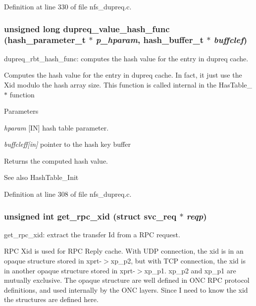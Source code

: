 Definition at line 330 of file nfs\_\-dupreq.c.
\subsubsection[{dupreq\_\-value\_\-hash\_\-func}]{\setlength{\rightskip}{0pt plus 5cm}unsigned long dupreq\_\-value\_\-hash\_\-func (hash\_\-parameter\_\-t $\ast$ {\em p\_\-hparam}, \/  hash\_\-buffer\_\-t $\ast$ {\em buffclef})}\label{nfs__dupreq_8c_a7363cd3531f6119e8a2047a57e51e08f}
dupreq\_\-rbt\_\-hash\_\-func: computes the hash value for the entry in dupreq cache.

Computes the hash value for the entry in dupreq cache. In fact, it just use the Xid modulo the hash array size. This function is called internal in the HasTable\_\-$\ast$ function


\begin{DoxyParams}{Parameters}
\item[{\em hparam}][IN] hash table parameter. \item[{\em buffcleff\mbox{[}in\mbox{]}}]pointer to the hash key buffer\end{DoxyParams}
\begin{DoxyReturn}{Returns}
the computed hash value.
\end{DoxyReturn}
\begin{DoxySeeAlso}{See also}
HashTable\_\-Init 
\end{DoxySeeAlso}


Definition at line 308 of file nfs\_\-dupreq.c.
\subsubsection[{get\_\-rpc\_\-xid}]{\setlength{\rightskip}{0pt plus 5cm}unsigned int get\_\-rpc\_\-xid (struct svc\_\-req $\ast$ {\em reqp})}\label{nfs__dupreq_8c_ae04d38ace0d9a143801c1625135d4ad7}
get\_\-rpc\_\-xid: extract the transfer Id from a RPC request.

RPC Xid is used for RPC Reply cache. With UDP connection, the xid is in an opaque structure stored in xprt-\/$>$xp\_\-p2, but with TCP connection, the xid is in another opaque structure stored in xprt-\/$>$xp\_\-p1. xp\_\-p2 and xp\_\-p1 are mutually exclusive. The opaque structure are well defined in ONC RPC protocol definitions, and used internally by the ONC layers. Since I need to know the xid the structures are defined here.


